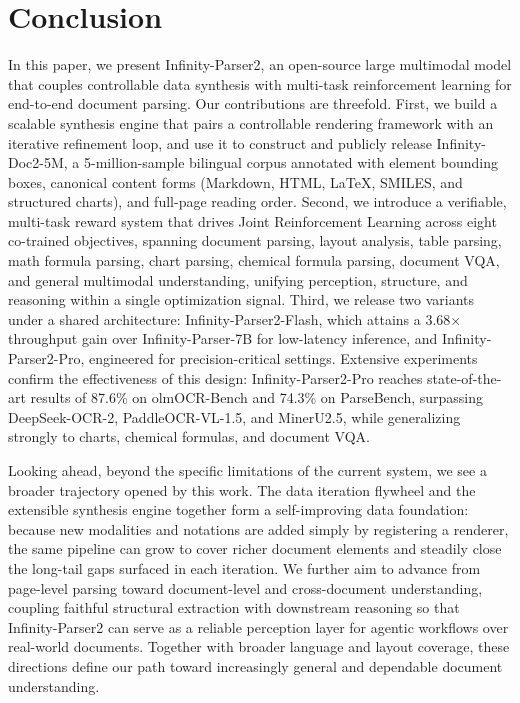 \section{Conclusion}

In this paper, we present Infinity-Parser2, an open-source large multimodal model that couples controllable data synthesis with multi-task reinforcement learning for end-to-end document parsing. Our contributions are threefold. First, we build a scalable synthesis engine that pairs a controllable rendering framework with an iterative refinement loop, and use it to construct and publicly release Infinity-Doc2-5M, a 5-million-sample bilingual corpus annotated with element bounding boxes, canonical content forms (Markdown, HTML, LaTeX, SMILES, and structured charts), and full-page reading order. Second, we introduce a verifiable, multi-task reward system that drives Joint Reinforcement Learning across eight co-trained objectives, spanning document parsing, layout analysis, table parsing, math formula parsing, chart parsing, chemical formula parsing, document VQA, and general multimodal understanding, unifying perception, structure, and reasoning within a single optimization signal. Third, we release two variants under a shared architecture: Infinity-Parser2-Flash, which attains a 3.68$\times$ throughput gain over Infinity-Parser-7B for low-latency inference, and Infinity-Parser2-Pro, engineered for precision-critical settings. Extensive experiments confirm the effectiveness of this design: Infinity-Parser2-Pro reaches state-of-the-art results of 87.6\% on olmOCR-Bench and 74.3\% on ParseBench, surpassing DeepSeek-OCR-2, PaddleOCR-VL-1.5, and MinerU2.5, while generalizing strongly to charts, chemical formulas, and document VQA.

Looking ahead, beyond the specific limitations of the current system, we see a broader trajectory opened by this work. The data iteration flywheel and the extensible synthesis engine together form a self-improving data foundation: because new modalities and notations are added simply by registering a renderer, the same pipeline can grow to cover richer document elements and steadily close the long-tail gaps surfaced in each iteration. We further aim to advance from page-level parsing toward document-level and cross-document understanding, coupling faithful structural extraction with downstream reasoning so that Infinity-Parser2 can serve as a reliable perception layer for agentic workflows over real-world documents. Together with broader language and layout coverage, these directions define our path toward increasingly general and dependable document understanding.